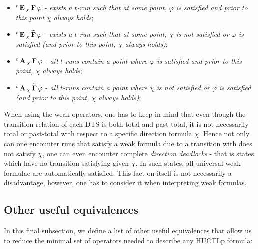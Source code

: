 \begin{itemize}
	\item ${}^{t}\operatorname{\mathbf{E}}{}_{\chi}\operatorname{\mathbf{F}} \varphi$ - \emph{exists a $t$-run such that at some point, $\varphi$ is satisfied and prior to this point $\chi$ always holds};
	\item ${}^{t}\operatorname{\mathbf{E}}{}_{\chi}\operatorname{\mathbf{\widetilde{F}}} \varphi$ - \emph{exists a $t$-run such that at some point, $\chi$ is not satisfied or $\varphi$ is satisfied (and prior to this point, $\chi$ always holds)};
	\item ${}^{t}\operatorname{\mathbf{A}}{}_{\chi}\operatorname{\mathbf{F}} \varphi$ - \emph{all $t$-runs contain a point where $\varphi$ is satisfied and prior to this point, $\chi$ always holds};
	\item ${}^{t}\operatorname{\mathbf{A}}{}_{\chi}\operatorname{\mathbf{\widetilde{F}}} \varphi$ - \emph{all $t$-runs contain a point where $\chi$ is not satisfied or $\varphi$ is satisfied (and prior to this point, $\chi$ always holds)};
\end{itemize}

When using the weak operators, one has to keep in mind that even though the transition relation of each \ac{DTS} is both total and past-total, it is not necessarily total or past-total with respect to a specific direction formula $\chi$. Hence not only can one encounter runs that satisfy a weak formula due to a transition with does not satisfy $\chi$, one can even encounter complete \emph{direction deadlocks} - that is states which have no transition satisfying given $\chi$. In such states, all universal weak formulae are automatically satisfied. This fact on itself is not necessarily a disadvantage, however, one has to consider it when interpreting weak formulas.

\subsection{Other useful equivalences}
\label{sec:huctlEnd}

In this final subsection, we define a list of other useful equivalences that allow us to reduce the minimal set of operators needed to describe any \ac{HUCTLp} formula:

